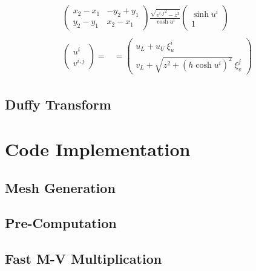 \documentclass [10pt,letterpaper]{article}
\begin{document}
\begin{subequations}
\begin{align}
\begin{split}
\begin{pmatrix}
				x_2-x_1 	& 	-y_2+y_1	\\
				y_2-y_1 	& 	x_2-x_1		
			\end{pmatrix}
			\frac{ \sqrt{{v^{i,j}}^2-z^2} } { \cosh{u^i} } 
			\begin{pmatrix}
				\sinh{u^i}				\\
				1
			\end{pmatrix}
		\end{split}
		\\
		\begin{split} 
			\begin{pmatrix}
				u^i					\\
				v^{i,j}
			\end{pmatrix}
			=&
			=
			\begin{pmatrix} 
				u_L
				+ 
				u_U
				\ \xi_u^i				\\
				v_L
				+ 
				\sqrt{ z^2 + (h \cosh{u^i})^2 }
				\ \xi_v^j				
			\end{pmatrix}
		\end{split}
	\end{align}
\end{subequations}

\subsection{Duffy Transform}
\label{sub:duffy-transform}






\section{Code Implementation}
\label{sec:code-implementation}
\subsection{Mesh Generation}
\label{sub:mesh-generation}
\subsection{Pre-Computation}
\label{sub:pre-computation}
\subsection{Fast M-V Multiplication}
\label{sub:fast-M-V-multiplication}
\end{document}
